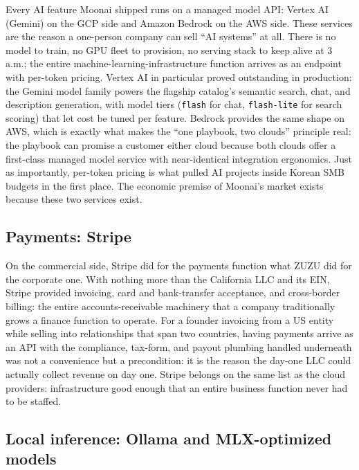 \documentclass{article}
\begin{document}
Every AI feature Moonai shipped runs on a managed model API: Vertex AI (Gemini) on the GCP side and Amazon Bedrock on the AWS side. These services are the reason a one-person company can sell ``AI systems'' at all. There is no model to train, no GPU fleet to provision, no serving stack to keep alive at 3 a.m.; the entire machine-learning-infrastructure function arrives as an endpoint with per-token pricing. Vertex AI in particular proved outstanding in production: the Gemini model family powers the flagship catalog's semantic search, chat, and description generation, with model tiers (\texttt{flash} for chat, \texttt{flash-lite} for search scoring) that let cost be tuned per feature. Bedrock provides the same shape on AWS, which is exactly what makes the ``one playbook, two clouds'' principle real: the playbook can promise a customer either cloud because both clouds offer a first-class managed model service with near-identical integration ergonomics. Just as importantly, per-token pricing is what pulled AI projects inside Korean SMB budgets in the first place. The economic premise of Moonai's market exists because these two services exist.

\subsection{Payments: Stripe}

On the commercial side, Stripe did for the payments function what ZUZU did for the corporate one. With nothing more than the California LLC and its EIN, Stripe provided invoicing, card and bank-transfer acceptance, and cross-border billing: the entire accounts-receivable machinery that a company traditionally grows a finance function to operate. For a founder invoicing from a US entity while selling into relationships that span two countries, having payments arrive as an API with the compliance, tax-form, and payout plumbing handled underneath was not a convenience but a precondition: it is the reason the day-one LLC could actually collect revenue on day one. Stripe belongs on the same list as the cloud providers: infrastructure good enough that an entire business function never had to be staffed.

\subsection{Local inference: Ollama and MLX-optimized models}
\end{document}
